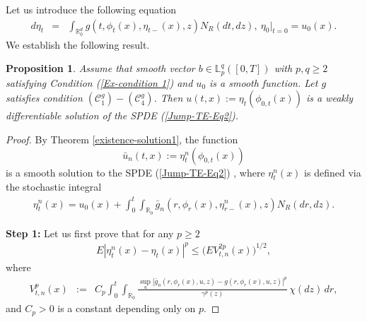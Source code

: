 \documentclass[12pt,oneside, reqno]{amsart}
\newcommand{\be}{\begin{eqnarray}}
\newcommand{\ee}{\end{eqnarray}}
\newcommand{\ce}{\begin{eqnarray*}}
\newcommand{\de}{\end{eqnarray*}}
\newtheorem{proposition}[theorem]{Proposition}
\def\mL{{\mathbb L}}
\def\mR{{\mathbb R}}
\def\sC{{\mathscr C}}
\def\geq{\geqslant}
\def\leq{\leqslant}
\numberwithin{equation}{section}
\begin{document}
Let us introduce the following equation
\ce 
d\eta_t&=&\int_{\mR^d_0}g(t,\phi_t(x),\eta_{t-}(x),z)N_R(dt,dz),~\eta_0\big|_{t=0}=u_0(x).
\de 
We establish the following result.

\begin{proposition}\label{proposition-weak-sol}
	Assume that smooth vector $b\in \mL_p^q([0,T])$ with $p,q\geq 2$ satisfying Condition (\ref{Ex-condition 1}) and $u_0$ is a smooth function. Let $g$ satisfies condition $(\sC_1^g)-(\sC_4^g)$. Then $u(t,x):=\eta_t(\phi_{0,t}(x))$ is a weakly differentiable solution of the SPDE (\ref{Jump-TE-Eq2}).
\end{proposition}
\begin{proof}
	By Theorem \ref{existence-solution1}, the function $$\bar{u}_n(t,x):=\eta_t^n(\phi_{0,t}(x))$$ is a smooth solution to the SPDE (\ref{Jump-TE-Eq2}) , where $\eta_t^n(x)$ is defined via the stochastic integral
	\be\label{initialV-Eq1+1}
	\eta_t^n(x)=u_0(x)+\int_0^t\int_{\mR_0} \bar{g}_n(r,\phi_{r}(x),\eta_{r-}^n(x),z)N_R(dr,dz).
	\ee
	
\textbf{Step 1:}	 Let us first prove that for any  $p\geq 2$
\be\label{etaNtoeta}
E |\eta_t^n(x)-\eta_t(x)|^p\leq \big(E V_{t,n}^{2p}(x)\big)^{1/2},
\ee 
where 
\ce 
V_{t,n}^p(x)&:=&C_p\int_0^t\int_{\mR_0} \frac{\sup_u|\bar{g}_n(r,\phi_{r}(x),u,z)-g(r,\phi_{r}(x),u,z)|^p}{\gamma^p(z)}\,\chi(dz)\,dr,
\de 
and $C_p>0$ is a constant depending only on $p$.




\end{proof}
\end{document}
